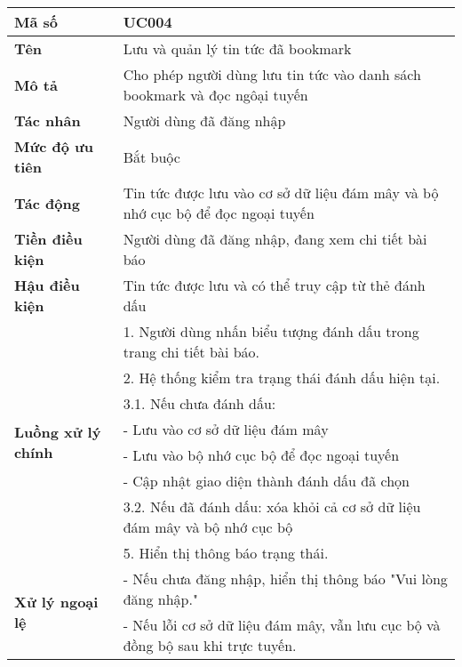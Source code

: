 \begingroup
\renewcommand{\arraystretch}{1.1}
\small
\centering
\noindent
\begin{minipage}{\textwidth}
    \centering
    \begin{tabular}{|m{3cm}|m{9cm}|}
        \hline
        \textbf{Mã số}  & UC004 \\
        \hline
        \textbf{Tên}  & Lưu và quản lý tin tức đã bookmark \\
        \hline
        \textbf{Mô tả}  & Cho phép người dùng lưu tin tức vào danh sách bookmark và đọc ngôại tuyến \\
        \hline
        \textbf{Tác nhân}  & Người dùng đã đăng nhập \\
        \hline
        \textbf{Mức độ ưu tiên}  & Bắt buộc \\
        \hline
        \textbf{Tác động}  & Tin tức được lưu vào cơ sở dữ liệu đám mây và bộ nhớ cục bộ để đọc ngoại tuyến \\
        \hline
        \textbf{Tiền điều kiện}  & Người dùng đã đăng nhập, đang xem chi tiết bài báo \\
        \hline
        \textbf{Hậu điều kiện}  & Tin tức được lưu và có thể truy cập từ thẻ đánh dấu \\
        \hline
        \multirow{8}{*}{\textbf{Luồng xử lý chính}}
            & 1. Người dùng nhấn biểu tượng đánh dấu trong trang chi tiết bài báo. \\
            & 2. Hệ thống kiểm tra trạng thái đánh dấu hiện tại. \\
            & 3.1. Nếu chưa đánh dấu: \\
            & - Lưu vào cơ sở dữ liệu đám mây \\
            & - Lưu vào bộ nhớ cục bộ để đọc ngoại tuyến \\
            & - Cập nhật giao diện thành đánh dấu đã chọn \\
            & 3.2. Nếu đã đánh dấu: xóa khỏi cả cơ sở dữ liệu đám mây và bộ nhớ cục bộ \\
            & 5. Hiển thị thông báo trạng thái. \\
        \hline
        \multirow{2}{*}{\textbf{Xử lý ngoại lệ}}
            & - Nếu chưa đăng nhập, hiển thị thông báo "Vui lòng đăng nhập." \\
            & - Nếu lỗi cơ sở dữ liệu đám mây, vẫn lưu cục bộ và đồng bộ sau khi trực tuyến. \\
        \hline
    \end{tabular}
\end{minipage}
\endgroup


